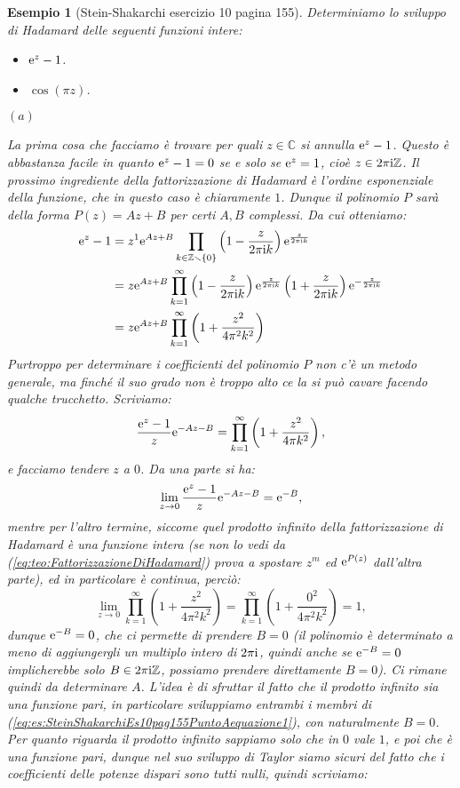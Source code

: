 \documentclass[11pt]{book}
\theoremstyle{Definizione}
\theoremstyle{TeoremaProposizioneLemmaCorollarioCongettura}
\theoremstyle{OsservazioneNotaEsempio}
\newtheorem{myes}{Esempio}[section]
\newcommand{\Z}{\mathbb{Z}}
\newcommand{\C}{\mathbb{C}}
\newcommand{\tolto}{\smallsetminus}
\renewcommand{\i}{\textup{i}}
\newcommand{\e}{\textup{e}}
\begin{document}
\begin{myes}[Stein-Shakarchi esercizio 10 pagina 155]\label{es:SteinShakarchiEs10pag155}
Determiniamo lo sviluppo di Hadamard delle seguenti funzioni intere:
\begin{itemize}
\item[$(a)$] $\e^{z}-1$.
\item[$(b)$] $\cos(\pi z)$.
\end{itemize}
\begin{flushleft}
$(a)$
\end{flushleft}
La prima cosa che facciamo è trovare per quali $z\in \C$ si annulla $\e^{z}-1$. Questo è abbastanza facile in quanto $\e^{z}-1 = 0$ se e solo se $\e^{z} = 1$, cioè $z\in 2\pi \i \Z$. Il prossimo ingrediente della fattorizzazione di Hadamard è l'ordine esponenziale della funzione, che in questo caso è chiaramente $1$. Dunque il polinomio $P$ sarà della forma $P(z) = Az+B$ per certi $A,B$ complessi. Da cui otteniamo:
\begin{align*}
\e^{z}-1 &= z^1 \e^{Az+B} \prod_{k\in \Z\tolto \{0\}} \left(1-\frac{z}{2\pi\i k}\right)\e^{\frac{z}{2\pi\i k}}\\
&= z\e^{Az+B} \prod_{k = 1}^\infty \left(1-\frac{z}{2\pi\i k}\right)\e^{\frac{z}{2\pi\i k}}\left(1+\frac{z}{2\pi\i k}\right)\e^{-\frac{z}{2\pi\i k}}\\
&= z \e^{Az+B} \prod_{k = 1}^\infty \left(1+\frac{z^2}{4\pi^2k^2}\right)
\end{align*}
Purtroppo per determinare i coefficienti del polinomio $P$ non c'è un metodo generale, ma finché il suo grado non è troppo alto ce la si può cavare facendo qualche trucchetto. Scriviamo:
\begin{equation}\label{eq:es:SteinShakarchiEs10pag155PuntoAequazione1}
\frac{\e^{z}-1}{z}\e^{-Az-B} = \prod_{k = 1}^\infty \left(1+\frac{z^2}{4\pi k^2}\right),
\end{equation}
e facciamo tendere $z$ a $0$. Da una parte si ha:
$$
\lim_{z \to 0}\frac{\e^{z}-1}{z}\e^{-Az-B} = \e^{-B},
$$
mentre per l'altro termine, siccome quel prodotto infinito della fattorizzazione di Hadamard è una funzione intera (se non lo vedi da (\ref{eq:teo:FattorizzazioneDiHadamard}) prova a spostare $z^m$ ed $\e^{P(z)}$ dall'altra parte), ed in particolare è continua, perciò:
$$
\lim_{z\to 0} \prod_{k = 1}^\infty \left(1+\frac{z^2}{4\pi^2k^2}\right) = \prod_{k = 1}^\infty \left(1+\frac{0^2}{4\pi^2k^2}\right) = 1,
$$
dunque $\e^{-B} = 0$, che ci permette di prendere $B = 0$ (il polinomio è determinato a meno di aggiungergli un multiplo intero di $2\pi\i$, quindi anche se $\e^{-B} = 0$ implicherebbe solo $B\in 2\pi\i\Z$, possiamo prendere direttamente $B = 0$). Ci rimane quindi da determinare $A$. L'idea è di sfruttar il fatto che il prodotto infinito sia una funzione pari, in particolare sviluppiamo entrambi i membri di (\ref{eq:es:SteinShakarchiEs10pag155PuntoAequazione1}), con naturalmente $B = 0$. Per quanto riguarda il prodotto infinito sappiamo solo che in $0$ vale $1$, e poi che è una funzione pari, dunque nel suo sviluppo di Taylor siamo sicuri del fatto che i coefficienti delle potenze dispari sono tutti nulli, quindi scriviamo:

\end{myes}
\end{document}

